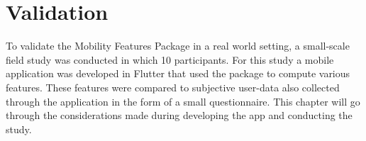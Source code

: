 \chapter{Validation}
\label{chapter:06}
To validate the Mobility Features Package in a real world setting, a small-scale field study was conducted in which 10 participants. For this study a mobile application was developed in Flutter that used the package to compute various features. These features were compared to subjective user-data also collected through the application in the form of a small questionnaire. This chapter will go through the considerations made during developing the app and conducting the study.



   
